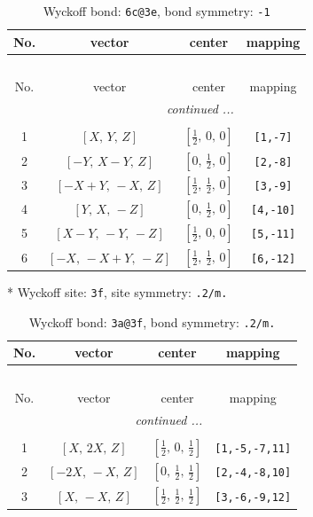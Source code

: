 \documentclass[fleqn,8pt]{jsarticle}
\begin{document}
\renewcommand{\arraystretch}{1.2}
\begin{longtable}{cccc}
\caption{Wyckoff bond: {\tt 6c@3e}, bond symmetry: {\tt -1}}
 \\
 \hline \hline
No. & vector & center & mapping \\ \hline \endfirsthead

\multicolumn{3}{l}{\tablename\ \thetable{}} \\
 \hline \hline
No. & vector & center & mapping \\ \hline \endhead

 \hline \hline
\multicolumn{3}{r}{\footnotesize\it continued ...} \\ \endfoot

 \hline \hline
\multicolumn{3}{r}{} \\ \endlastfoot

1 & $\left[ X,\, Y,\, Z \right]$ & $\left[ \frac{1}{2},\, 0,\, 0 \right]$ & {\tt [1,-7]} \\ \hline
2 & $\left[ - Y,\, X - Y,\, Z \right]$ & $\left[ 0,\, \frac{1}{2},\, 0 \right]$ & {\tt [2,-8]} \\ \hline
3 & $\left[ - X + Y,\, - X,\, Z \right]$ & $\left[ \frac{1}{2},\, \frac{1}{2},\, 0 \right]$ & {\tt [3,-9]} \\ \hline
4 & $\left[ Y,\, X,\, - Z \right]$ & $\left[ 0,\, \frac{1}{2},\, 0 \right]$ & {\tt [4,-10]} \\ \hline
5 & $\left[ X - Y,\, - Y,\, - Z \right]$ & $\left[ \frac{1}{2},\, 0,\, 0 \right]$ & {\tt [5,-11]} \\ \hline
6 & $\left[ - X,\, - X + Y,\, - Z \right]$ & $\left[ \frac{1}{2},\, \frac{1}{2},\, 0 \right]$ & {\tt [6,-12]} \\
\end{longtable}
* Wyckoff site: {\tt 3f}, site symmetry: {\tt .2/m.}
\renewcommand{\arraystretch}{1.2}
\begin{longtable}{cccc}
\caption{Wyckoff bond: {\tt 3a@3f}, bond symmetry: {\tt .2/m.}}
 \\
 \hline \hline
No. & vector & center & mapping \\ \hline \endfirsthead

\multicolumn{3}{l}{\tablename\ \thetable{}} \\
 \hline \hline
No. & vector & center & mapping \\ \hline \endhead

 \hline \hline
\multicolumn{3}{r}{\footnotesize\it continued ...} \\ \endfoot

 \hline \hline
\multicolumn{3}{r}{} \\ \endlastfoot

1 & $\left[ X,\, 2 X,\, Z \right]$ & $\left[ \frac{1}{2},\, 0,\, \frac{1}{2} \right]$ & {\tt [1,-5,-7,11]} \\ \hline
2 & $\left[ - 2 X,\, - X,\, Z \right]$ & $\left[ 0,\, \frac{1}{2},\, \frac{1}{2} \right]$ & {\tt [2,-4,-8,10]} \\ \hline
3 & $\left[ X,\, - X,\, Z \right]$ & $\left[ \frac{1}{2},\, \frac{1}{2},\, \frac{1}{2} \right]$ & {\tt [3,-6,-9,12]} \\
\end{longtable}
\end{document}

